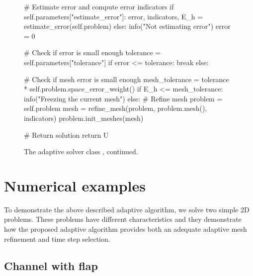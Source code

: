 \begin{figure}[!t]
\bwfig
\caption{The adaptive solver class , continued.}
\begin{python}
            # Estimate error and compute error indicators
            if self.parameters["estimate_error"]:
                error, indicators, E_h = estimate_error(self.problem)
            else:
                info("Not estimating error")
                error = 0

            # Check if error is small enough
            tolerance = self.parameters["tolerance"]
            if error <= tolerance:
                break
            else:

            # Check if mesh error is small enough
            mesh_tolerance = tolerance * self.problem.space_error_weight()
            if E_h <= mesh_tolerance:
                info("Freezing the current mesh")
            else:
                # Refine mesh
                problem = self.problem
                mesh = refine_mesh(problem,
                                   problem.mesh(),
                                   indicators)
                problem.init_meshes(mesh)

        # Return solution
        return U
\end{python}
\label{selim:fig:FSISolver-2}
\end{figure}

\section{Numerical examples}

To demonstrate the above described adaptive algorithm, we solve two
simple 2D problems. These problems have different characteristics and
they demonstrate how the proposed adaptive algorithm provides both an
adequate adaptive mesh refinement and time step selection.

\subsection{Channel with flap}

